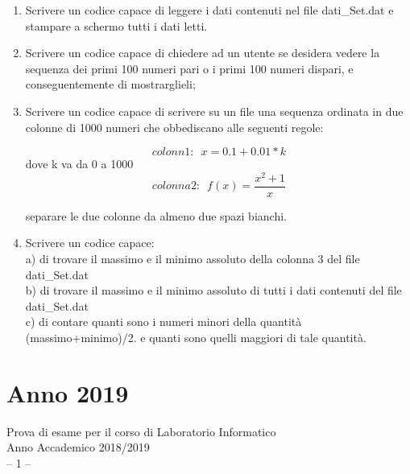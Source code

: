 \documentclass[11pt,fleqn]{book} %
\begin{document}
\begin{enumerate}
\item Scrivere un codice capace di  leggere i dati contenuti nel file  dati\_Set.dat e stampare a schermo tutti i dati letti.

\item Scrivere un codice capace di chiedere ad un utente se desidera vedere la sequenza dei primi 100 numeri pari o i primi 100 numeri dispari, e conseguentemente di mostrarglieli; 

\item Scrivere un codice capace di scrivere su un file una sequenza ordinata in due colonne
di 1000 numeri che obbediscano alle seguenti regole:

$$colonn1:\,\,\, x = 0.1+0.01*k$$ dove k va da 0 a 1000\\
$$colonna2:\,\,\,f(x) = \frac{x^2+1}{x}$$ 

separare le due colonne da almeno due spazi bianchi. 

\item Scrivere un codice capace:\\
     a) di trovare il massimo e il minimo assoluto della colonna 3 del file dati\_Set.dat\\
     b) di trovare il massimo e il minimo assoluto di tutti i dati contenuti del file dati\_Set.dat\\
     c) di contare quanti sono i numeri minori della quantità (massimo+minimo)/2. e quanti sono quelli maggiori di tale quantità. 


\end{enumerate}

\newpage
\section{Anno 2019}

{
\Large\centering
Prova di esame per il corso di Laboratorio Informatico\\		
Anno Accademico 2018/2019\\
-- 1 --\\
}
\end{document}
